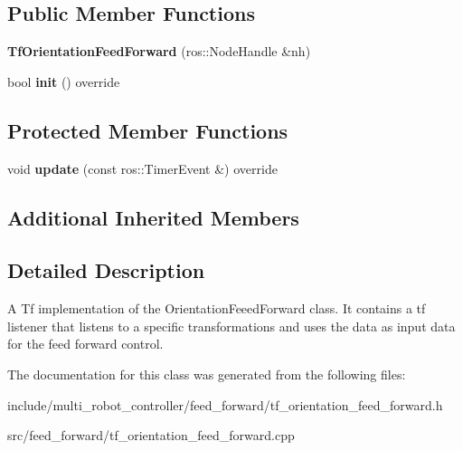 \subsection*{Public Member Functions}
\begin{DoxyCompactItemize}
\item 
\mbox{\label{classTfOrientationFeedForward_ac6b65030da947e765a431b5b82d600b1}} 
{\bfseries Tf\+Orientation\+Feed\+Forward} (ros\+::\+Node\+Handle \&nh)
\item 
\mbox{\label{classTfOrientationFeedForward_a68e54f0b974cc6aa5fab10ec5b5a18cf}} 
bool {\bfseries init} () override
\end{DoxyCompactItemize}
\subsection*{Protected Member Functions}
\begin{DoxyCompactItemize}
\item 
\mbox{\label{classTfOrientationFeedForward_aa74b9cf9be940b3d49bb6288fa88d2fa}} 
void {\bfseries update} (const ros\+::\+Timer\+Event \&) override
\end{DoxyCompactItemize}
\subsection*{Additional Inherited Members}


\subsection{Detailed Description}
A Tf implementation of the Orientation\+Feeed\+Forward class. It contains a tf listener that listens to a specific transformations and uses the data as input data for the feed forward control. 

The documentation for this class was generated from the following files\+:\begin{DoxyCompactItemize}
\item 
include/multi\+\_\+robot\+\_\+controller/feed\+\_\+forward/tf\+\_\+orientation\+\_\+feed\+\_\+forward.\+h\item 
src/feed\+\_\+forward/tf\+\_\+orientation\+\_\+feed\+\_\+forward.\+cpp\end{DoxyCompactItemize}
